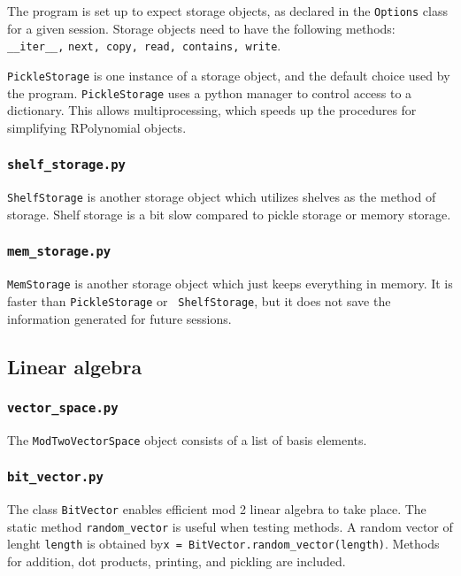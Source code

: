 \documentclass{article}
\begin{document}
The program is set up to expect storage objects, as declared in the
{\tt Options} class for a given session. Storage objects need to have
the following methods: {\verb|__iter__,|} {\tt next, copy, read,
  contains, write}.

{\tt PickleStorage} is one instance of a storage object, and the
default choice used by the program. {\tt PickleStorage} uses a python
manager to control access to a dictionary. This allows
multiprocessing, which speeds up the procedures for simplifying
RPolynomial objects.

\subsubsection{ {\tt shelf\_storage.py}} 

{\tt ShelfStorage} is another storage object which utilizes shelves as
the method of storage. Shelf storage is a bit slow compared to pickle
storage or memory storage.

\subsubsection{ {\tt mem\_storage.py}}

{\tt MemStorage} is another storage object which just keeps everything
in memory. It is faster than {\tt PickleStorage} or {\tt
  ShelfStorage}, but it does not save the information generated for
future sessions.

\subsection{Linear algebra}

\subsubsection{{\tt vector\_space.py}}
The {\tt ModTwoVectorSpace} object consists of a list of basis
elements.

\subsubsection{{\tt bit\_vector.py}}
The class {\tt BitVector} enables efficient mod 2 linear algebra to
take place. The static method {\tt random\_vector} is useful when
testing methods. A random vector of lenght {\tt length} is obtained
by{\tt x = BitVector.random\_vector(length)}. Methods for addition, dot
products, printing, and pickling are included. 
\end{document}
